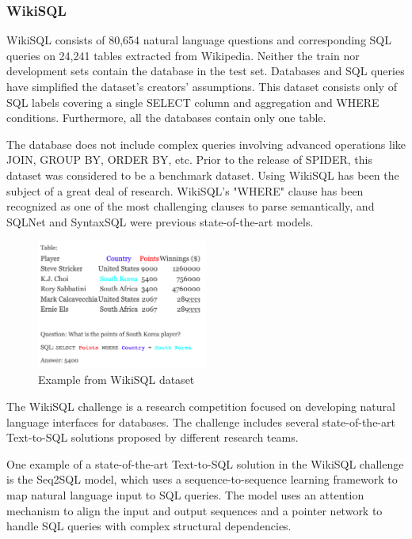 \subsubsection{WikiSQL}

WikiSQL consists of 80,654 natural language questions and corresponding SQL queries on 24,241 tables extracted from Wikipedia. Neither the train nor development sets contain the database in the test set. Databases and SQL queries have simplified the dataset's creators' assumptions. This dataset consists only of SQL labels covering a single SELECT column and aggregation and WHERE conditions. Furthermore, all the databases contain only one table.

The database does not include complex queries involving advanced operations like JOIN, GROUP BY, ORDER BY, etc. Prior to the release of SPIDER, this dataset was considered to be a benchmark dataset. Using WikiSQL has been the subject of a great deal of research. WikiSQL's "WHERE" clause has been recognized as one of the most challenging clauses to parse semantically, and SQLNet and SyntaxSQL were previous state-of-the-art models.


\begin{figure}[htb]
    \centering
    \includegraphics[width=0.5\textwidth]{pics/db/WikiSQL.png}
    \caption{Example from WikiSQL dataset\cite{DBLP:journals/corr/abs-1902-01069}}
    \label{fig:WikiSQL}
\end{figure}

The WikiSQL challenge is a research competition focused on developing natural language interfaces for databases. The challenge includes several state-of-the-art Text-to-SQL solutions proposed by different research teams.

One example of a state-of-the-art Text-to-SQL solution in the WikiSQL challenge is the Seq2SQL model, which uses a sequence-to-sequence learning framework to map natural language input to SQL queries. The model uses an attention mechanism to align the input and output sequences and a pointer network to handle SQL queries with complex structural dependencies.

